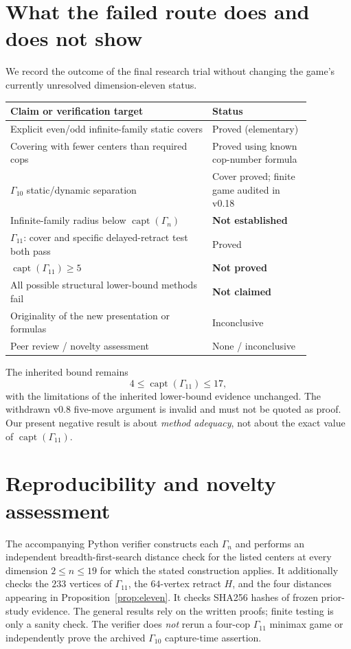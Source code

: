 \documentclass[10pt]{article}
\newcommand{\Ga}{\Gamma}
\newcommand{\capt}{\operatorname{capt}}
\begin{document}
\section{What the failed route does and does not show}
We record the outcome of the final research trial without changing the
game's currently unresolved dimension-eleven status.
\begin{center}
\small
\begin{tabular}{p{0.58\linewidth}p{0.29\linewidth}}
\toprule
Claim or verification target & Status \\
\midrule
Explicit even/odd infinite-family static covers & Proved (elementary) \\
Covering with fewer centers than required cops & Proved using known cop-number formula \\
$\Ga_{10}$ static/dynamic separation & Cover proved; finite game audited in v0.18 \\
Infinite-family radius below $\capt(\Ga_n)$ & \textbf{Not established} \\
$\Ga_{11}$: cover and specific delayed-retract test both pass & Proved \\
$\capt(\Ga_{11})\ge5$ & \textbf{Not proved} \\
All possible structural lower-bound methods fail & \textbf{Not claimed} \\
Originality of the new presentation or formulas & Inconclusive \\
Peer review / novelty assessment & None / inconclusive \\
\bottomrule
\end{tabular}
\end{center}

The inherited bound remains
\[
 4\le\capt(\Ga_{11})\le17,
\]
with the limitations of the inherited lower-bound evidence unchanged.
The withdrawn v0.8 five-move argument is invalid and must not be quoted
as proof. Our present negative result is about \emph{method adequacy}, not
about the exact value of $\capt(\Ga_{11})$.

\section{Reproducibility and novelty assessment}
The accompanying Python verifier constructs each $\Ga_n$ and performs
an independent breadth-first-search distance check for the listed centers
at every dimension $2\le n\le19$ for which the stated construction applies.
It additionally checks the $233$ vertices of $\Ga_{11}$, the $64$-vertex
retract $H$, and the four distances appearing in
Proposition~\ref{prop:eleven}. It checks SHA256 hashes of frozen
prior-study evidence. The general results rely on the written proofs;
finite testing is only a sanity check. The verifier does \emph{not}
rerun a four-cop $\Ga_{11}$ minimax game or independently prove the
archived $\Ga_{10}$ capture-time assertion.
\end{document}
